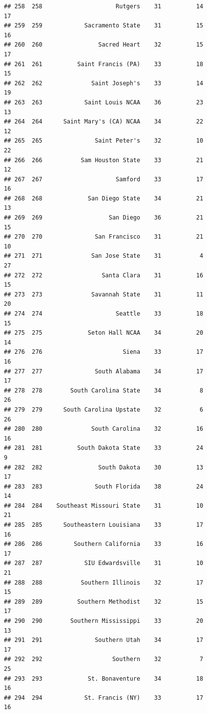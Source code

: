\documentclass[]{book}
\begin{document}
\begin{verbatim}
## 258  258                     Rutgers    31          14            17
## 259  259            Sacramento State    31          15            16
## 260  260                Sacred Heart    32          15            17
## 261  261          Saint Francis (PA)    33          18            15
## 262  262              Saint Joseph's    33          14            19
## 263  263            Saint Louis NCAA    36          23            13
## 264  264      Saint Mary's (CA) NCAA    34          22            12
## 265  265               Saint Peter's    32          10            22
## 266  266           Sam Houston State    33          21            12
## 267  267                     Samford    33          17            16
## 268  268             San Diego State    34          21            13
## 269  269                   San Diego    36          21            15
## 270  270               San Francisco    31          21            10
## 271  271              San Jose State    31           4            27
## 272  272                 Santa Clara    31          16            15
## 273  273              Savannah State    31          11            20
## 274  274                     Seattle    33          18            15
## 275  275             Seton Hall NCAA    34          20            14
## 276  276                       Siena    33          17            16
## 277  277               South Alabama    34          17            17
## 278  278        South Carolina State    34           8            26
## 279  279      South Carolina Upstate    32           6            26
## 280  280              South Carolina    32          16            16
## 281  281          South Dakota State    33          24             9
## 282  282                South Dakota    30          13            17
## 283  283               South Florida    38          24            14
## 284  284    Southeast Missouri State    31          10            21
## 285  285      Southeastern Louisiana    33          17            16
## 286  286         Southern California    33          16            17
## 287  287            SIU Edwardsville    31          10            21
## 288  288           Southern Illinois    32          17            15
## 289  289          Southern Methodist    32          15            17
## 290  290        Southern Mississippi    33          20            13
## 291  291               Southern Utah    34          17            17
## 292  292                    Southern    32           7            25
## 293  293             St. Bonaventure    34          18            16
## 294  294            St. Francis (NY)    33          17            16

\end{verbatim}
\end{document}
